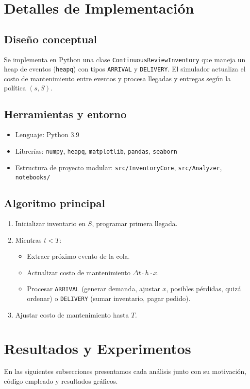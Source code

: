 \documentclass[12pt,a4paper]{article}
\begin{document}
\section{Detalles de Implementación}
\subsection{Diseño conceptual}
Se implementa en Python una clase \texttt{ContinuousReviewInventory} que maneja un heap de eventos (\texttt{heapq}) con tipos \texttt{ARRIVAL} y \texttt{DELIVERY}. El simulador actualiza el costo de mantenimiento entre eventos y procesa llegadas y entregas según la política $(s,S)$.

\subsection{Herramientas y entorno}
\begin{itemize}
  \item Lenguaje: Python 3.9
  \item Librerías: \texttt{numpy}, \texttt{heapq}, \texttt{matplotlib}, \texttt{pandas}, \texttt{seaborn}
  \item Estructura de proyecto modular:  
    \texttt{src/InventoryCore}, \texttt{src/Analyzer}, \texttt{notebooks/}
\end{itemize}

\subsection{Algoritmo principal}
\begin{enumerate}
  \item Inicializar inventario en $S$, programar primera llegada.
  \item Mientras $t<T$:
    \begin{itemize}
      \item Extraer próximo evento de la cola.
      \item Actualizar costo de mantenimiento $\Delta t \cdot h \cdot x$.
      \item Procesar \texttt{ARRIVAL} (generar demanda, ajustar $x$, posibles pérdidas, quizá ordenar) o \texttt{DELIVERY} (sumar inventario, pagar pedido).
    \end{itemize}
  \item Ajustar costo de mantenimiento hasta $T$.
\end{enumerate}

\section{Resultados y Experimentos}
En las siguientes subsecciones presentamos cada análisis junto con su motivación, código empleado y resultados gráficos.
\end{document}
